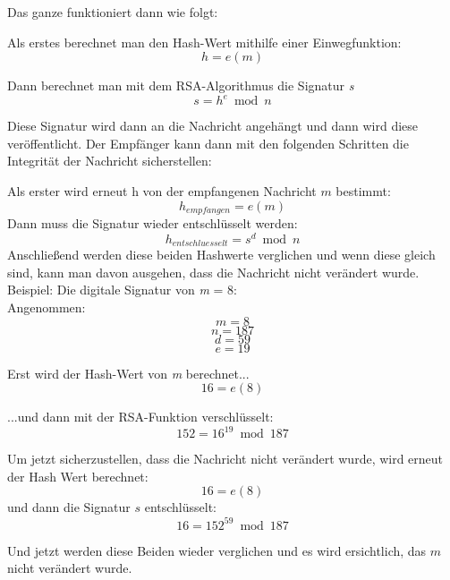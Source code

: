 \documentclass[12pt,a4paper]{scrartcl}
\begin{document}
Das ganze funktioniert dann wie folgt:

Als erstes berechnet man den Hash-Wert mithilfe einer Einwegfunktion:
$$ {h = e(m)} $$

Dann berechnet man mit dem RSA-Algorithmus die Signatur \textit{s}
$$ {s = h^e \bmod n} $$

Diese Signatur wird dann an die Nachricht angehängt und dann wird diese veröffentlicht.
Der Empfänger kann dann mit den folgenden Schritten die Integrität der Nachricht sicherstellen:

Als erster wird erneut h von der empfangenen Nachricht $m$ bestimmt:
$${h_{empfangen} = e(m) }$$
Dann muss die Signatur wieder entschlüsselt werden:
$$ {h_{entschluesselt} = s^d \bmod n} $$
Anschließend werden diese beiden Hashwerte verglichen und wenn diese gleich sind, kann man davon ausgehen, dass die Nachricht nicht verändert wurde. \\


Beispiel: Die digitale Signatur von \textit{m} = 8:\\ 
Angenommen:
$${ \textit{m} = 8 }$$
$${ \textit{n} = 187 }$$
$${ \textit{d} = 59 }$$
$${ \textit{e} = 19 }$$


Erst wird der Hash-Wert von \textit{m} berechnet...
$$ {16 = e(8)} $$	

...und dann mit der RSA-Funktion verschlüsselt: %
$$ {152 = 16^19 \bmod 187} $$	

Um jetzt sicherzustellen, dass die Nachricht nicht verändert wurde, wird erneut der Hash Wert berechnet:
$$ {16 = e(8)} $$	
und dann die Signatur $s$ entschlüsselt:
$$ {16 = 152^59 \bmod 187} $$

Und jetzt werden diese Beiden wieder verglichen und es wird ersichtlich, das $m$ nicht verändert wurde.


	 	
\end{document}
